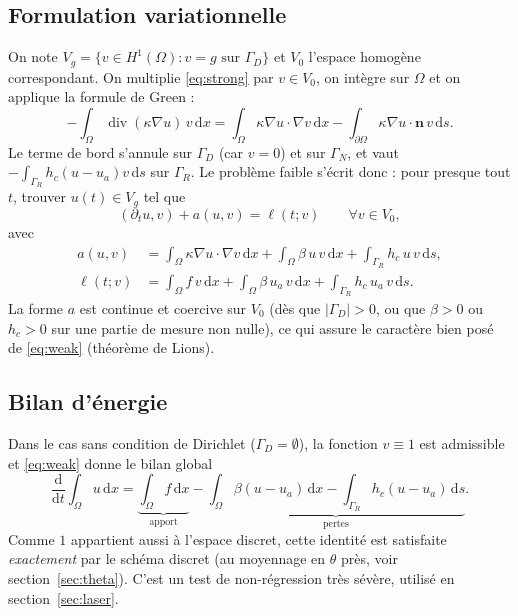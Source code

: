 \documentclass[11pt,a4paper]{article}
\newcommand{\dd}{\,\mathrm{d}}
\DeclareMathOperator{\divg}{div}
\begin{document}
\subsection{Formulation variationnelle}
On note $V_g = \{v\in H^1(\Omega) : v = g \text{ sur } \Gamma_D\}$ et $V_0$ l'espace homogène
correspondant. On multiplie \eqref{eq:strong} par $v\in V_0$, on intègre sur $\Omega$ et on applique la
formule de Green :
\[
  -\int_\Omega \divg(\kappa\nabla u)\, v \dd x
  = \int_\Omega \kappa \nabla u\cdot\nabla v \dd x - \int_{\partial\Omega} \kappa \nabla u\cdot\bm{n}\, v \dd s .
\]
Le terme de bord s'annule sur $\Gamma_D$ (car $v=0$) et sur $\Gamma_N$, et vaut
$-\int_{\Gamma_R} h_c(u-u_a)v\dd s$ sur $\Gamma_R$. Le problème faible s'écrit donc : pour presque
tout $t$, trouver $u(t)\in V_g$ tel que
\begin{equation}\label{eq:weak}
  \left(\partial_t u, v\right) + a(u,v) = \ell(t; v) \qquad \forall v \in V_0,
\end{equation}
avec
\begin{align*}
  a(u,v) &= \int_\Omega \kappa\nabla u\cdot\nabla v \dd x + \int_\Omega \beta\, u\, v\dd x
            + \int_{\Gamma_R} h_c\, u\, v \dd s, \\
  \ell(t;v) &= \int_\Omega f\, v\dd x + \int_\Omega \beta\, u_a\, v \dd x + \int_{\Gamma_R} h_c\, u_a\, v\dd s .
\end{align*}
La forme $a$ est continue et coercive sur $V_0$ (dès que $|\Gamma_D|>0$, ou que $\beta>0$ ou
$h_c>0$ sur une partie de mesure non nulle), ce qui assure le caractère bien posé de \eqref{eq:weak}
(théorème de Lions).

\subsection{Bilan d'énergie}\label{sec:energy}
Dans le cas sans condition de Dirichlet ($\Gamma_D=\emptyset$), la fonction $v\equiv 1$ est admissible
et \eqref{eq:weak} donne le bilan global
\begin{equation}\label{eq:energy}
  \frac{\mathrm{d}}{\mathrm{d}t}\int_\Omega u \dd x
  = \underbrace{\int_\Omega f \dd x}_{\text{apport}}
  - \underbrace{\int_\Omega \beta(u-u_a)\dd x - \int_{\Gamma_R} h_c(u-u_a)\dd s}_{\text{pertes}} .
\end{equation}
Comme $1$ appartient aussi à l'espace discret, cette identité est satisfaite \emph{exactement} par le
schéma discret (au moyennage en $\theta$ près, voir section~\ref{sec:theta}). C'est un test de non-régression
très sévère, utilisé en section~\ref{sec:laser}.
\end{document}
